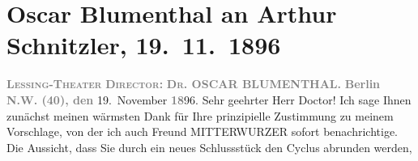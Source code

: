 

         
         \renewcommand{\erwaehntePersonen}{Personen: Oskar Blumenthal, Friedrich Mitterwurzer}
         \renewcommand{\erwaehnteInstitutionen}{Institutionen: Lessing-Theater}
         \renewcommand{\erwaehnteOrte}{Orte: Berlin, Wien}
         \renewcommand{\erwaehnteWerke}{Werke: Agonie, Anatol, Denksteine}
               \section[Oscar Blumenthal an Arthur Schnitzler, 19. 11. 1896]{ Oscar Blumenthal an Arthur Schnitzler, 19. 11. 1896}\nopagebreak{}\rehead{ }\begin{ledgroupsized}[t]{13cm}\normalsize\beginnumbering \toendnotes[C]{\smallbreak\pagebreak[2]} 
\toendnotes[C]{\smallbreak}\pstart
           \noindent{}\centering{}{\pb}\textcolor{gray}{\textbf{\textsc{Lessing-Theater}}}\pend
           \pstart
           \noindent{}\centering{}\textcolor{gray}{\textbf{\textsc{Director}:}}{ }\textcolor{gray}{\textbf{\textsc{Dr.}{ }OSCAR BLUMENTHAL.}}\pend
           \pstart
           \noindent{}\raggedleft{}\textcolor{gray}{\textbf{Berlin N.W. (40), den}}{ }19. November \textcolor{gray}{\textbf{18}}96.\pend
           \pstart\center{}Sehr geehrter Herr Doctor!\pend\pstart
           Ich sage Ihnen zunächst meinen wärmsten Dank für Ihre prinzipielle Zustimmung zu
               meinem Vorschlage, von der ich auch Freund MITTERWURZER sofort benachrichtige. Die Aussicht, dass Sie durch ein neues Schlussstück den
                  Cyclus abrunden werden,

\end{ledgroupsized}
